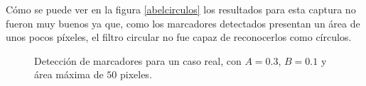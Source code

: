 Cómo se puede ver en la figura \ref{abelcirculos} los resultados para esta captura no fueron muy buenos ya que, como los marcadores detectados presentan un área de unos pocos píxeles, el filtro circular no fue capaz de reconocerlos como círculos.  

\begin{figure}[H]
        \centering
        \hspace{5 mm}
  \caption{Detección de marcadores para un caso real, con $A=0.3$, $B=0.1$ y área máxima de $50$ pixeles.}
      \label{ejemploabeldet}
\end{figure}


